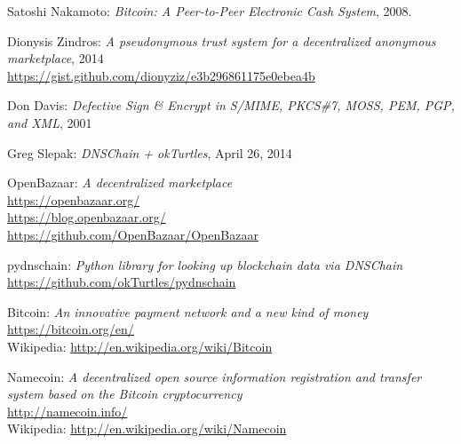 \documentclass[journal]{IEEEtran}
\begin{document}
\begin{thebibliography}{9}

    Satoshi Nakamoto: 
    \emph{Bitcoin: A Peer-to-Peer Electronic Cash System}, 
    2008.

    Dionysis Zindros:
    \emph{A pseudonymous trust system for a decentralized 
          anonymous marketplace},
    2014\\
    \url{https://gist.github.com/dionyziz/e3b296861175e0ebea4b}

    Don Davis:
    \emph{Defective Sign \& Encrypt in S/MIME, PKCS\#7, MOSS, 
          PEM, PGP, and XML},
    2001

    Greg Slepak:
    \emph{DNSChain + okTurtles},
    April 26, 2014
    
    OpenBazaar:
    \emph{A decentralized marketplace}\\
    \url{https://openbazaar.org/}\\
    \url{https://blog.openbazaar.org/}\\
    \url{https://github.com/OpenBazaar/OpenBazaar}
    
    pydnschain:
    \emph{Python library for looking up blockchain data via DNSChain}\\
    \url{https://github.com/okTurtles/pydnschain}

    Bitcoin:
    \emph{An innovative payment network and a new kind of money}\\
    \url{https://bitcoin.org/en/}\\
    Wikipedia: \url{http://en.wikipedia.org/wiki/Bitcoin}

    Namecoin:
    \emph{A decentralized open source information registration and 
        transfer system based on the Bitcoin cryptocurrency}\\
    \url{http://namecoin.info/}\\
    Wikipedia: \url{http://en.wikipedia.org/wiki/Namecoin}


\end{thebibliography}

\end{document}
